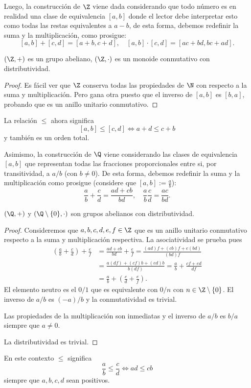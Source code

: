 \documentclass[11pt,oneside]{book}
\begin{document}
Luego, la construcción de $\Z$ viene dada considerando que todo número es en realidad una clase de equivalencia $[a,b]$ donde el lector debe interpretar esto como todas las restas equivalentes a $a-b$, de esta forma, debemos redefinir la suma y la multiplicación, como prosigue:
$$[a,b]+[c,d]=[a+b,c+d],\quad[a,b]\cdot[c,d]=[ac+bd,bc+ad].$$
\begin{thm}
$(\Z,+)$ es un grupo abeliano, $(\Z,\cdot)$ es un monoide conmutativo con distributividad.
\end{thm}
\begin{proof}
Es fácil ver que $\Z$ conserva todas las propiedades de $\N$ con respecto a la suma y multiplicación. Pero gana otra puesto que el inverso de $[a,b]$ es $[b,a]$, probando que es un anillo unitario conmutativo.
\end{proof}
La relación $\leq$ ahora significa
$$[a,b]\leq[c,d]\iff a+d\leq c+b$$
y también es un orden total.

Asimismo, la construcción de $\Q$ viene considerando las clases de equivalencia $[a,b]$ que representan todas las fracciones proporcionales entre si, por transitividad, a $a/b$ (con $b\neq 0$). De esta forma, debemos redefinir la suma y la multiplicación como prosigue (considere que $[a,b]:=\frac{a}{b}$):
$$\frac{a}{b}+\frac{c}{d}=\frac{ad+cb}{bd},\quad\frac{a}{b}\frac{c}{d}=\frac{ac}{bd}.$$
\begin{thm}
$(\Q,+)$ y $(\Q\setminus\{0\},\cdot)$ son grupos abelianos con distributividad.
\end{thm}
\begin{proof}
Consideremos que $a,b,c,d,e,f\in\Z$ que es un anillo unitario conmutativo respecto a la suma y multiplicación respectiva. La asociatividad se prueba pues
\begin{align*}
\left(\frac{a}{b}+\frac{c}{d}\right)+\frac{e}{f}&=\frac{ad+cb}{bd}+\frac{e}{f}=\frac{(ad)f+(cb)f+e(bd)}{(bd)f}\\
&=\frac{a(df)+(cf)b+(ed)b}{b(df)}=\frac{a}{b}+\frac{cf+ed}{df}\\
&=\frac{a}{b}+\left(\frac{c}{d}+\frac{e}{f}\right).
\end{align*}
El elemento neutro es el $0/1$ que es equivalente con $0/n$ con $n\in\Z\setminus\{0\}$. El inverso de $a/b$ es $(-a)/b$ y la conmutatividad es trivial.

Las propiedades de la multiplicación son inmediatas y el inverso de $a/b$ es $b/a$ siempre que $a\neq 0$.

La distributividad es trivial.
\end{proof}
En este contexto $\leq$ significa
$$\frac{a}{b}\leq\frac{c}{d}\iff ad\leq cb$$
siempre que $a,b,c,d$ sean positivos.
\end{document}
